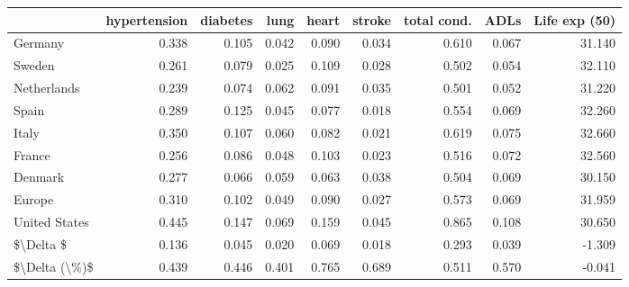 \begin{tabular}{lrrrrrrrr}
\toprule
{} &  hypertension &  diabetes &   lung &  heart &  stroke &  total cond. &   ADLs &  Life exp (50) \\
\midrule
Germany       &         0.338 &     0.105 &  0.042 &  0.090 &   0.034 &        0.610 &  0.067 &         31.140 \\
Sweden        &         0.261 &     0.079 &  0.025 &  0.109 &   0.028 &        0.502 &  0.054 &         32.110 \\
Netherlands   &         0.239 &     0.074 &  0.062 &  0.091 &   0.035 &        0.501 &  0.052 &         31.220 \\
Spain         &         0.289 &     0.125 &  0.045 &  0.077 &   0.018 &        0.554 &  0.069 &         32.260 \\
Italy         &         0.350 &     0.107 &  0.060 &  0.082 &   0.021 &        0.619 &  0.075 &         32.660 \\
France        &         0.256 &     0.086 &  0.048 &  0.103 &   0.023 &        0.516 &  0.072 &         32.560 \\
Denmark       &         0.277 &     0.066 &  0.059 &  0.063 &   0.038 &        0.504 &  0.069 &         30.150 \\
Europe        &         0.310 &     0.102 &  0.049 &  0.090 &   0.027 &        0.573 &  0.069 &         31.959 \\
United States &         0.445 &     0.147 &  0.069 &  0.159 &   0.045 &        0.865 &  0.108 &         30.650 \\
\$\textbackslash Delta \$     &         0.136 &     0.045 &  0.020 &  0.069 &   0.018 &        0.293 &  0.039 &         -1.309 \\
\$\textbackslash Delta (\textbackslash \%)\$ &         0.439 &     0.446 &  0.401 &  0.765 &   0.689 &        0.511 &  0.570 &         -0.041 \\
\bottomrule
\end{tabular}
